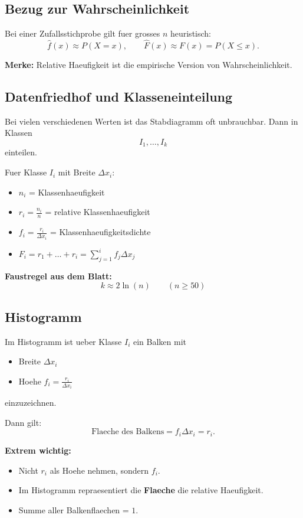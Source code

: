 \documentclass[a4paper,11pt]{article}
\begin{document}
\subsection{Bezug zur Wahrscheinlichkeit}
Bei einer Zufallsstichprobe gilt fuer grosses $n$ heuristisch:
\[
\hat f(x)\approx P(X=x),\qquad \hat F(x)\approx F(x)=P(X\le x).
\]

\textbf{Merke:}
Relative Haeufigkeit ist die empirische Version von Wahrscheinlichkeit.

\subsection{Datenfriedhof und Klasseneinteilung}
Bei vielen verschiedenen Werten ist das Stabdiagramm oft unbrauchbar. Dann in Klassen
\[
I_1,\dots,I_k
\]
einteilen.

Fuer Klasse $I_i$ mit Breite $\Delta x_i$:
\begin{itemize}
  \item $n_i$ = Klassenhaeufigkeit
  \item $r_i=\frac{n_i}{n}$ = relative Klassenhaeufigkeit
  \item $f_i=\frac{r_i}{\Delta x_i}$ = Klassenhaeufigkeitsdichte
  \item $F_i=r_1+\dots+r_i=\sum_{j=1}^i f_j\Delta x_j$
\end{itemize}

\textbf{Faustregel aus dem Blatt:}
\[
k\approx 2\ln(n)\qquad (n\ge 50)
\]

\subsection{Histogramm}
Im Histogramm ist ueber Klasse $I_i$ ein Balken mit
\begin{itemize}
  \item Breite $\Delta x_i$
  \item Hoehe $f_i=\frac{r_i}{\Delta x_i}$
\end{itemize}
einzuzeichnen.

Dann gilt:
\[
\text{Flaeche des Balkens}=f_i\Delta x_i=r_i.
\]

\textbf{Extrem wichtig:}
\begin{itemize}
  \item Nicht $r_i$ als Hoehe nehmen, sondern $f_i$.
  \item Im Histogramm repraesentiert die \textbf{Flaeche} die relative Haeufigkeit.
  \item Summe aller Balkenflaechen = $1$.
\end{itemize}
\end{document}
